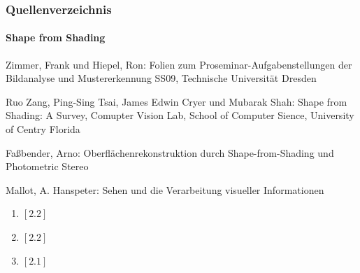 \documentclass{beamer}
\begin{document}
\begin{frame}
	\frametitle{Quellenverzeichnis}
	\framesubtitle{Shape from Shading}
	
	\begin{tiny}
		\begin{enumerate}[label={[2.\arabic*]}]
			\item Zimmer, Frank und Hiepel, Ron: Folien zum Proseminar-Aufgabenstellungen der Bildanalyse und Mustererkennung SS09, Technische Universität Dresden
			\item Ruo Zang, Ping-Sing Tsai, James Edwin Cryer und Mubarak Shah: Shape from Shading: A Survey, Comupter Vision Lab, School of Computer Sience, University of Centry Florida
			\item Faßbender, Arno: Oberflächenrekonstruktion durch Shape-from-Shading und Photometric Stereo
			\item Mallot, A. Hanspeter: Sehen und die Verarbeitung visueller Informationen
		\end{enumerate}
		
		\vspace{1em}
		\begin{enumerate}[label={Fig. 2.\arabic*}]
		\item $\left[2.2\right]$
		\item $\left[2.2\right]$
		\item $\left[2.1\right]$
		\end{enumerate}
	\end{tiny}
\end{frame}
\end{document}

